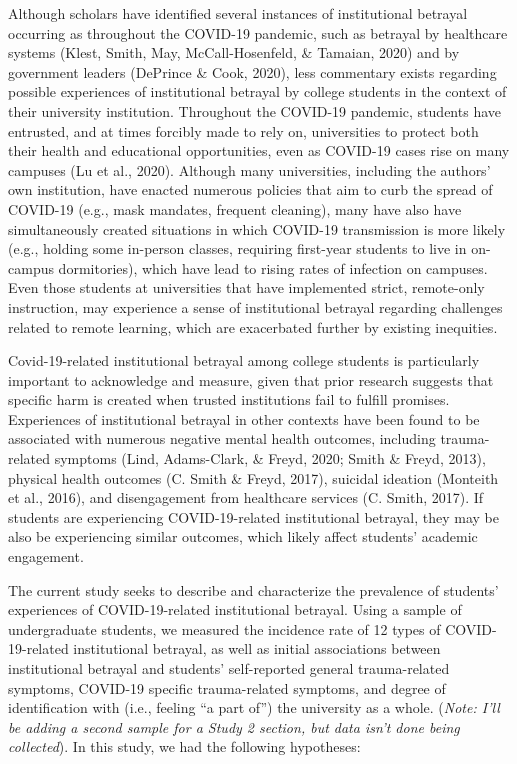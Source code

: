 \documentclass[
  english,
  man, noextraspace]{apa6}
\begin{document}
Although scholars have identified several instances of institutional betrayal occurring as throughout the COVID-19 pandemic, such as betrayal by healthcare systems (Klest, Smith, May, McCall-Hosenfeld, \& Tamaian, 2020) and by government leaders (DePrince \& Cook, 2020), less commentary exists regarding possible experiences of institutional betrayal by college students in the context of their university institution. Throughout the COVID-19 pandemic, students have entrusted, and at times forcibly made to rely on, universities to protect both their health and educational opportunities, even as COVID-19 cases rise on many campuses (Lu et al., 2020). Although many universities, including the authors' own institution, have enacted numerous policies that aim to curb the spread of COVID-19 (e.g., mask mandates, frequent cleaning), many have also have simultaneously created situations in which COVID-19 transmission is more likely (e.g., holding some in-person classes, requiring first-year students to live in on-campus dormitories), which have lead to rising rates of infection on campuses. Even those students at universities that have implemented strict, remote-only instruction, may experience a sense of institutional betrayal regarding challenges related to remote learning, which are exacerbated further by existing inequities.

Covid-19-related institutional betrayal among college students is particularly important to acknowledge and measure, given that prior research suggests that specific harm is created when trusted institutions fail to fulfill promises. Experiences of institutional betrayal in other contexts have been found to be associated with numerous negative mental health outcomes, including trauma-related symptoms (Lind, Adams-Clark, \& Freyd, 2020; Smith \& Freyd, 2013), physical health outcomes (C. Smith \& Freyd, 2017), suicidal ideation (Monteith et al., 2016), and disengagement from healthcare services (C. Smith, 2017). If students are experiencing COVID-19-related institutional betrayal, they may be also be experiencing similar outcomes, which likely affect students' academic engagement.

The current study seeks to describe and characterize the prevalence of students' experiences of COVID-19-related institutional betrayal. Using a sample of undergraduate students, we measured the incidence rate of 12 types of COVID-19-related institutional betrayal, as well as initial associations between institutional betrayal and students' self-reported general trauma-related symptoms, COVID-19 specific trauma-related symptoms, and degree of identification with (i.e., feeling \enquote{a part of}) the university as a whole. (\emph{Note: I'll be adding a second sample for a Study 2 section, but data isn't done being collected}). In this study, we had the following hypotheses:
\end{document}
